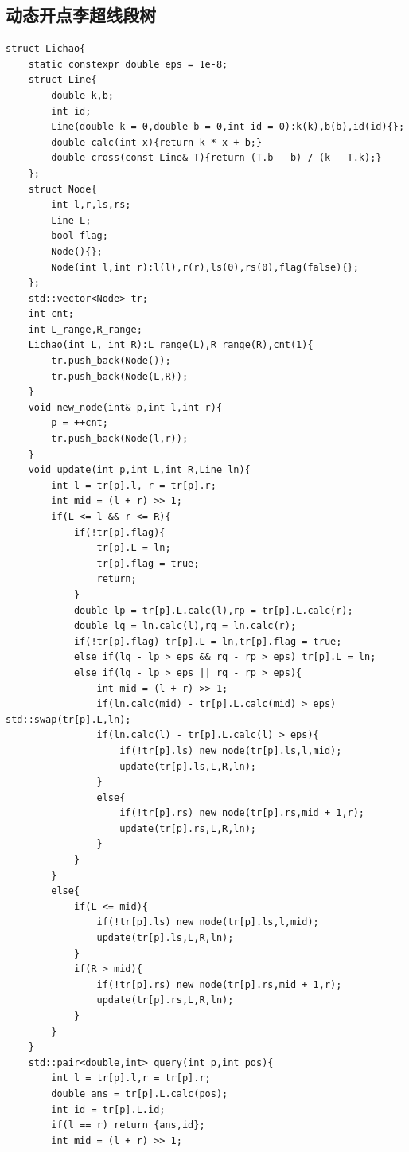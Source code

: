\subsection{动态开点李超线段树}
\begin{lstlisting}[caption={}]
struct Lichao{
    static constexpr double eps = 1e-8;
    struct Line{
        double k,b;
        int id;
        Line(double k = 0,double b = 0,int id = 0):k(k),b(b),id(id){};
        double calc(int x){return k * x + b;}
        double cross(const Line& T){return (T.b - b) / (k - T.k);}
    };
    struct Node{
        int l,r,ls,rs;
        Line L;
        bool flag;
        Node(){};
        Node(int l,int r):l(l),r(r),ls(0),rs(0),flag(false){};
    };
    std::vector<Node> tr;
    int cnt;
    int L_range,R_range;
    Lichao(int L, int R):L_range(L),R_range(R),cnt(1){
        tr.push_back(Node());
        tr.push_back(Node(L,R));
    }
    void new_node(int& p,int l,int r){
        p = ++cnt;
        tr.push_back(Node(l,r));
    }
    void update(int p,int L,int R,Line ln){
        int l = tr[p].l, r = tr[p].r;
        int mid = (l + r) >> 1;
        if(L <= l && r <= R){
            if(!tr[p].flag){
                tr[p].L = ln;
                tr[p].flag = true;
                return;
            }
            double lp = tr[p].L.calc(l),rp = tr[p].L.calc(r);
            double lq = ln.calc(l),rq = ln.calc(r);
            if(!tr[p].flag) tr[p].L = ln,tr[p].flag = true;
            else if(lq - lp > eps && rq - rp > eps) tr[p].L = ln;
            else if(lq - lp > eps || rq - rp > eps){
                int mid = (l + r) >> 1;
                if(ln.calc(mid) - tr[p].L.calc(mid) > eps) std::swap(tr[p].L,ln);
                if(ln.calc(l) - tr[p].L.calc(l) > eps){
                    if(!tr[p].ls) new_node(tr[p].ls,l,mid);
                    update(tr[p].ls,L,R,ln);
                }
                else{
                    if(!tr[p].rs) new_node(tr[p].rs,mid + 1,r);
                    update(tr[p].rs,L,R,ln);
                }
            }
        }
        else{
            if(L <= mid){
                if(!tr[p].ls) new_node(tr[p].ls,l,mid);
                update(tr[p].ls,L,R,ln);
            }
            if(R > mid){
                if(!tr[p].rs) new_node(tr[p].rs,mid + 1,r);
                update(tr[p].rs,L,R,ln);
            }
        }
    }
    std::pair<double,int> query(int p,int pos){
        int l = tr[p].l,r = tr[p].r;
        double ans = tr[p].L.calc(pos);
        int id = tr[p].L.id;
        if(l == r) return {ans,id};
        int mid = (l + r) >> 1;


\end{lstlisting}
